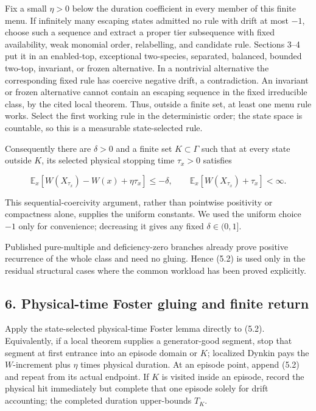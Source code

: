 Fix a small \(\eta>0\) below the duration coefficient in every member of
this finite menu. If infinitely many escaping states admitted no rule
with drift at most \(-1\), choose such a sequence and extract a proper
tier subsequence with fixed availability, weak monomial order,
relabelling, and candidate rule. Sections 3--4 put it in an enabled-top,
exceptional two-species, separated, balanced, bounded two-top,
invariant, or frozen alternative. In a nontrivial alternative the
corresponding fixed rule has coercive negative drift, a contradiction.
An invariant or frozen alternative cannot contain an escaping sequence
in the fixed irreducible class, by the cited local theorem. Thus,
outside a finite set, at least one menu rule works. Select the first
working rule in the deterministic order; the state space is countable,
so this is a measurable state-selected rule.

Consequently there are \(\delta>0\) and a finite set \(K\subset\Gamma\)
such that at every state outside \(K\), its selected physical stopping
time \(\tau_x>0\) satisfies

\[
   \mathbb E_x[W(X_{\tau_x})-W(x)+\eta\tau_x]\le-\delta,
   \qquad \mathbb E_x[W(X_{\tau_x})+\tau_x]<\infty.        \tag{5.2}
  \]

This sequential-coercivity argument, rather than pointwise positivity or
compactness alone, supplies the uniform constants. We used the uniform
choice \(-1\) only for convenience; decreasing it gives any fixed
\(\delta\in(0,1]\).

Published pure-multiple and deficiency-zero branches already prove
positive recurrence of the whole class and need no gluing. Hence (5.2)
is used only in the residual structural cases where the common workload
has been proved explicitly.

\subsection{6. Physical-time Foster gluing and finite
return}

Apply the state-selected physical-time Foster lemma directly to (5.2).
Equivalently, if a local theorem supplies a generator-good segment, stop
that segment at first entrance into an episode domain or \(K\);
localized Dynkin pays the \(W\)-increment plus \(\eta\) times physical
duration. At an episode point, append (5.2) and repeat from its actual
endpoint. If \(K\) is visited inside an episode, record the physical hit
immediately but complete that one episode solely for drift accounting;
the completed duration upper-bounds \(T_K\).

